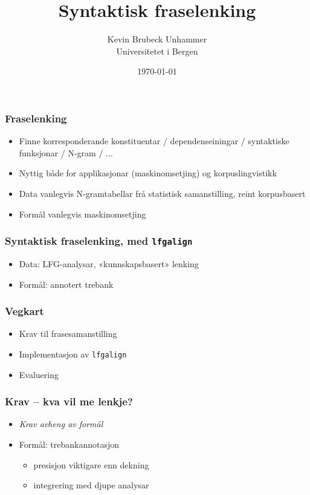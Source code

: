 \documentclass[bigger]{beamer}
\title{Syntaktisk fraselenking}
\author{Kevin Brubeck Unhammer\\ Universitetet i Bergen}
\date{\today}
\begin{document}
\maketitle

\begin{frame}\frametitle{Fraselenking}
    \begin{itemize}
    \item Finne korresponderande
      konstituentar / dependenseiningar / syntaktiske funksjonar / N-gram / ...
    \item Nyttig både for applikasjonar (maskinomsetjing) og
      korpuslingvistikk
    \item Data vanlegvis N-gramtabellar frå statistisk samanstilling,
      reint korpusbasert
    \item Formål vanlegvis maskinomsetjing
    \end{itemize}
\end{frame}

\begin{frame}\frametitle{Syntaktisk fraselenking, med \texttt{lfgalign}}
  \begin{itemize}
  \item Data: LFG-analysar, «kunnskapsbasert» lenking
  \item Formål: annotert trebank
  \end{itemize}
\end{frame}

\begin{frame}\frametitle{Vegkart}
  \begin{itemize}
  \item Krav til frasesamanstilling
  \item Implementasjon av \texttt{lfgalign}
  \item Evaluering
  \end{itemize}
\end{frame}

\begin{frame}\frametitle{Krav -- kva vil me lenkje?}
  \begin{itemize}
  \item \emph{Krav avheng av formål}
  \item Formål: trebankannotasjon
    \begin{itemize}
    \item presisjon viktigare enn dekning
    \item integrering med djupe analysar
    \end{itemize}
  \end{itemize}
\end{frame}
\end{document}
